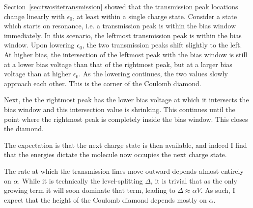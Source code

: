 Section~\ref{sec:twositetransmission} showed that the transmission peak locations change linearly with $\epsilon_0$, at least within a single charge state. Consider a state which starts on resonance, i.e. a transmission peak is within the bias window immediately. In this scenario, the leftmost transmission peak is within the bias window. Upon lowering $\epsilon_0$, the two transmission peaks shift slightly to the left. At higher bias, the intersection of the leftmost peak with the bias window is still at a lower bias voltage than that of the rightmost peak, but at a larger bias voltage than at higher $\epsilon_0$. As the lowering continues, the two values slowly approach each other. This is the corner of the Coulomb diamond.

Next, the the rightmost peak has the lower bias voltage at which it intersects the bias window and this intersection value is shrinking. This continues until the point where the rightmost peak is completely inside the bias window. This closes the diamond. 

The expectation is that the next charge state is then available, and indeed I find that the energies dictate the molecule now occupies the next charge state.

The rate at which the transmission lines move outward depends almost entirely on $\alpha$. While it is technically the level-splitting $\Delta$, it is trivial that as the only growing term it will soon dominate that term, leading to $\Delta \approx \alpha V$. As such, I expect that the height of the Coulomb diamond depends mostly on $\alpha$. 

